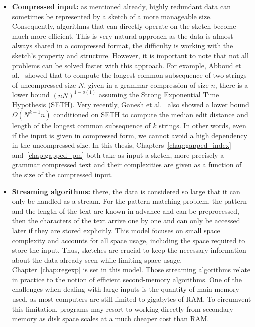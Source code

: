 \begin{itemize}
\item \textbf{Compressed input:} as mentioned already, highly redundant data can sometimes be represented by a sketch of a more manageable size. 
Consequently, algorithms that can directly operate on the sketch become much more efficient. This is very natural approach as the data is almost always shared in a compressed format, the difficulty is working with the sketch's property and structure. However, it is important to note that not all problems can be solved faster with this approach. For example, Abboud et al.~\cite{abboud2017fine} showed that to compute the longest common subsequence of two strings of uncompressed size $N$, given in a grammar compression of size $n$, there is a lower bound $(nN)^{1-o(1)}$ assuming the Strong Exponential Time Hypothesis (SETH). 
Very recently, Ganesh et al.~\cite{ganesh2022compression} also showed a lower bound $\Omega(N^{k-1}n)$ conditioned on SETH to compute the median edit distance and length of the longest common subsequence of $k$ strings.
In other words, even if the input is given in compressed form, we cannot avoid a high dependency in the uncompressed size. In this thesis, Chapters~\ref{chap:gapped_index} and~\ref{chap:gapped_pm} both take as input a sketch, more precisely a grammar compressed text and their complexities are given as a function of the size of the compressed input.
%
\item \textbf{Streaming algorithms:} there, the data is considered so large that it can only be handled as a stream. %
For the pattern matching problem, the pattern and the length of the text are known in advance and can be preprocessed, then the characters of the text arrive one by one and can only be accessed later if they are stored explicitly. 
This model focuses on small space complexity and accounts for all space usage, including the space required to store the input.
Thus, sketches are crucial to keep the necessary information about the data already seen while limiting space usage.
Chapter~\ref{chap:regexp} is set in this model. %
Those streaming algorithms relate in practice to the notion of efficient second-memory algorithms. One of the challenges when dealing with large inputs is the quantity of main memory used, as most computers are still limited to gigabytes of RAM. To circumvent this limitation, programs may resort to working directly from secondary memory as disk space scales at a much cheaper cost than RAM.

\end{itemize}
